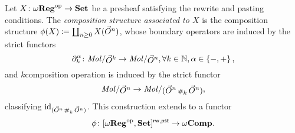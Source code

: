 \begin{dfn}
    Let \( X \colon \omega\mathbf{Reg}^\mathrm{op} \to \mathbf{Set} \) be a presheaf satisfying the rewrite and pasting conditions.
    The \emph{composition structure associated to \( X \)} is the composition structure \( \phi(X) \coloneqq \coprod_{n \geq 0} X(\vec{O}^{n}) \), whose boundary operators are induced by the strict functors
    \begin{equation*}
        \bd{k}{\a} \colon \molecin{\dglobe{k}} \to \molecin{\dglobe{n}}, \forall k \in \mathbb{N}, \a \in \set{- ,+},
    \end{equation*}
    and \( k \)\nbd composition operation is induced by the strict functor
    \begin{equation*}
        \molecin{\dglobe{n}} \to \molecin{(\dglobe{n} \cp{k} \dglobe{n})},
    \end{equation*}
    classifying \( \mathrm{id}_{(\vec{O}^{n} \,{\scriptstyle\#}_{k}\, \vec{O}^{n})} \).
    This construction extends to a functor 
    \begin{equation*}
        \phi \colon [\omega\mathbf{Reg}^\mathrm{op}, \mathbf{Set}]^{\mathsf{rw, pst}} \to \omega\mathbf{Comp}.
    \end{equation*}
\end{dfn}

